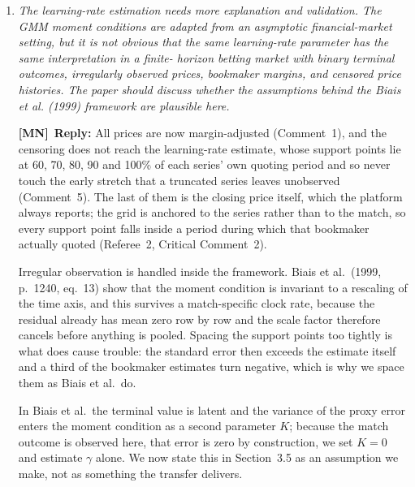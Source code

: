 \documentclass[letterpaper,12pt]{article}
\newcounter{b}
\newcommand{\ReplyMN}[1]{\par\noindent%
  \textcolor{mncol}{\textbf{[MN]}}~\textbf{Reply:} #1}
\begin{document}
\begin{enumerate}
\item \textit{The learning-rate estimation needs more explanation and validation. The GMM moment conditions are adapted from an asymptotic financial-market setting, but it is not
obvious that the same learning-rate parameter has the same interpretation in a finite-
horizon betting market with binary terminal outcomes, irregularly observed prices,
bookmaker margins, and censored price histories. The paper should discuss whether
the assumptions behind the Biais et al. (1999) framework are plausible here. }

\ReplyMN{All prices are now margin-adjusted (Comment~1), and the censoring does not reach the learning-rate estimate, whose support points lie at 60, 70, 80, 90 and 100\% of each series' own quoting period and so never touch the early stretch that a truncated series leaves unobserved (Comment~5). The last of them is the closing price itself, which the platform always reports; the grid is anchored to the series rather than to the match, so every support point falls inside a period during which that bookmaker actually quoted (Referee~2, Critical Comment~2).

Irregular observation is handled inside the framework. Biais et al.\ (1999, p.~1240, eq.~13) show that the moment condition is invariant to a rescaling of the time axis, and this survives a match-specific clock rate, because the residual already has mean zero row by row and the scale factor therefore cancels before anything is pooled. Spacing the support points too tightly is what does cause trouble: the standard error then exceeds the estimate itself and a third of the bookmaker estimates turn negative, which is why we space them as Biais et al.\ do.

In Biais et al.\ the terminal value is latent and the variance of the proxy error enters the moment condition as a second parameter $K$; because the match outcome is observed here, that error is zero by construction, we set $K = 0$ and estimate $\gamma$ alone. We now state this in Section~3.5 as an assumption we make, not as something the transfer delivers.}


\end{enumerate}
\end{document}
